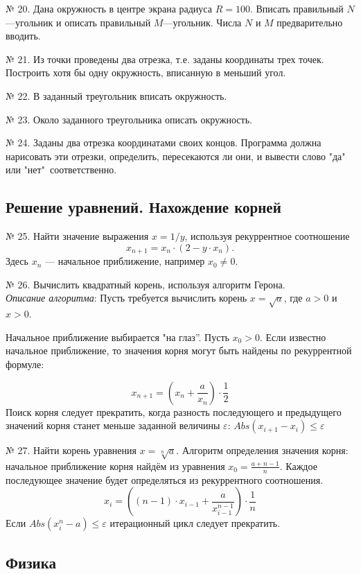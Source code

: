 № 20. Дана окружность в центре экрана радиуса $R=100$. Вписать правильный $N$ ---угольник и описать правильный $M$---угольник. Числа $N$ и $M$ предварительно вводить.

№ 21. Из точки проведены два отрезка, т.е. заданы координаты трех точек. Построить хотя бы одну окружность, вписанную в меньший угол.

№ 22. В заданный треугольник вписать окружность.

№ 23. Около заданного треугольника описать окружность.

№ 24. Заданы два отрезка координатами своих концов. Программа должна нарисовать эти отрезки, определить, пересекаются ли они, и вывести слово "да" \: или "нет"\ соответственно. 

\subsection{Решение уравнений. Нахождение корней}

№ 25. Найти значение выражения $x = 1/y$, используя рекуррентное соотношение 
$$x_{n+1} = x_n\cdot (2 - y\cdot x_n).$$ 
Здесь $x_n$ --- начальное приближение, например $x_0\neq 0$.

№ 26. Вычислить квадратный корень, используя алгоритм Герона.\\ {\it Описание алгоритма}: Пусть требуется вычислить корень $x = \sqrt{a}$, где $a>0$ и $x>0$.
 
Начальное   приближение выбирается "на глаз”. Пусть  $x_0 > 0$. Если известно начальное приближение, то значения корня могут быть найдены по рекуррентной формуле:

$$x_{n+1} = \left(x_n + \frac{a}{x_n}\right)\cdot\frac{1}{2}$$
Поиск корня следует прекратить, когда разность последующего и предыдущего значений корня станет меньше заданной величины $\varepsilon$:
$Abs(x_{i+1}-x_i)\leq\varepsilon$

№ 27. Найти корень уравнения $x = \sqrt[n]{a}$. Алгоритм опреде­ления значения корня: начальное приближение корня  найдём из уравнения    $x_0 = \frac{a + n -1}{n} $.  Каждое последующее значение будет определяться из рекуррентного соотношения. 
$$x_i = \left((n-1)\cdot x_{i-1} + \frac{a}{x^{n-1}_{i-1}}   \right)\cdot\frac{1}{n}$$
Если $Abs(x^n_{i}-a)\leq\varepsilon$ итерационный цикл следует прекратить. 

\subsection{Физика}

